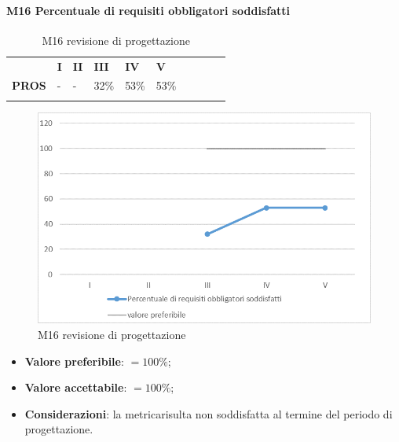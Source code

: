 \paragraph{M16 Percentuale di requisiti obbligatori soddisfatti} \mbox{}
\begin{longtable}[H!] {						
		>{}p{50mm}  		
		>{}p{8mm}
		>{}p{8mm}		
		>{}p{8mm}		
		>{}p{8mm}		
		>{}p{8mm}		
		>{}p{8mm}
		>{}p{8mm}
		>{}p{8mm}
		>{}p{8mm}
	}
	\rowcolor{gray!50}
	\textbf{} & \textbf{I} & \textbf{II} & \textbf{III} & \textbf{IV} & \textbf{V} \TBstrut \\ [2mm]
	\textbf{PROS} & - & - & 32\% & 53\% & 53\% \TBstrut \\ [2mm]
	\rowcolor{white}
	\caption{M16 revisione di progettazione\glo}
\end{longtable}
\begin{figure}[H] 	
\includegraphics[width=\linewidth]{./img/grafici/RP13.png}	
\caption{M16 revisione di progettazione\glo}	
\end{figure}
\begin{itemize}
	\item \textbf{Valore preferibile}: $=100\%$;
	\item \textbf{Valore accettabile}: $=100\%$;
	\item \textbf{Considerazioni}: la metrica\glosp risulta non soddisfatta al termine del periodo di progettazione\glo.
\end{itemize}
